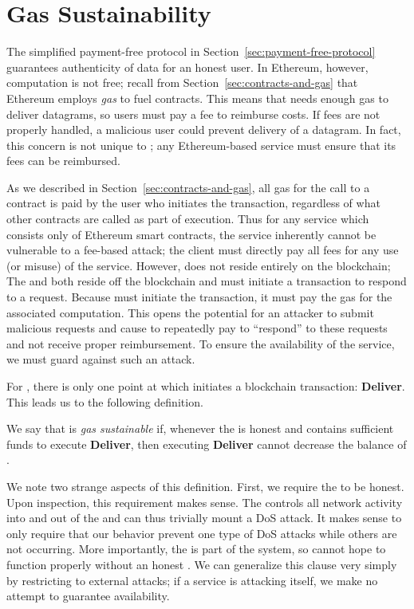 \section{Gas Sustainability}
\label{sec:gas-sustainability}

The simplified payment-free protocol in Section~\ref{sec:payment-free-protocol} guarantees authenticity of data for an honest user.
In Ethereum, however, computation is not free; recall from Section~\ref{sec:contracts-and-gas} that Ethereum employs \emph{gas} to fuel contracts.
This means that \tc needs enough gas to deliver datagrams, so users must pay a fee to reimburse costs.
If fees are not properly handled, a malicious user could prevent delivery of a datagram.
In fact, this concern is not unique to \tc; any Ethereum-based service must ensure that its fees can be reimbursed.

As we described in Section~\ref{sec:contracts-and-gas}, all gas for the call to a contract is paid by the user who initiates the transaction,
regardless of what other contracts are called as part of execution.
Thus for any service which consists only of Ethereum smart contracts, the service inherently cannot be vulnerable to a fee-based attack;
the client must directly pay all fees for any use (or misuse) of the service.
However, \tc does not reside entirely on the blockchain;
The \medname and \encname both reside off the blockchain and must initiate a transaction to respond to a request.
Because \tc must initiate the transaction, it must pay the gas for the associated computation.
This opens the potential for an attacker to submit malicious requests and cause \tc to repeatedly pay to ``respond'' to these requests and not receive proper reimbursement.
To ensure the availability of the service, we must guard against such an attack.

For \tc, there is only one point at which \tc initiates a blockchain transaction: {\bf Deliver}.
This leads us to the following definition.

\begin{definition}
  \label{def:tc-gas-sustainability}
  We say that \tc is \emph{gas sustainable} if, whenever the \medname is honest and \tcadd contains sufficient funds to execute {\bf Deliver},
  then executing {\bf Deliver} cannot decrease the balance of \tcadd.
\end{definition}

We note two strange aspects of this definition.
First, we require the \medname to be honest.
Upon inspection, this requirement makes sense.
The \medname controls all network activity into and out of the \encname and can thus trivially mount a DoS attack.
It makes sense to only require that our behavior prevent one type of DoS attacks while others are not occurring.
More importantly, the \medname is part of the \tc system, so \tc cannot hope to function properly without an honest \medname.
We can generalize this clause very simply by restricting to external attacks;
if a service is attacking itself, we make no attempt to guarantee availability.

